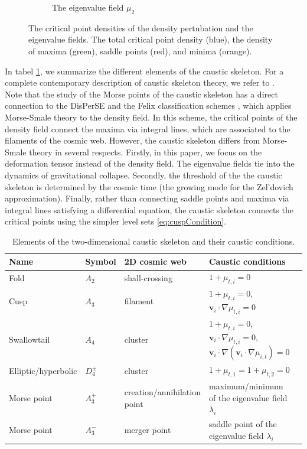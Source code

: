 \documentclass[a4paper, 11pt]{article}
\begin{document}
\begin{figure}
\begin{subfigure}[b]{0.32\textwidth}
\caption{The eigenvalue field $\mu_2$}
\end{subfigure}
\caption{The critical point densities of the density pertubation and the eigenvalue fields. The total critical point density (blue), the density of maxima (green), saddle points (red), and minima (orange).}\label{fig:critical}
\end{figure}

In tabel \ref{table:caustics}, we summarize the different elements of the caustic skeleton. For a complete contemporary description of caustic skeleton theory, we refer to \cite{Hidding:2014, Feldbrugge:2018}.\\


Note that the study of the Morse points of the caustic skeleton has a direct connection to the DisPerSE and the Felix classification schemes \cite{Pogosyan:2009, Sousbie:2011a, Sousbie:2011b, Shivashankar:2016}, which applies Morse-Smale theory to the density field. In this scheme, the critical points of the density field connect the maxima via integral lines, which are associated to the filaments of the cosmic web. However, the caustic skeleton differs from Morse-Smale theory in several respects. Firstly, in this paper, we focus on the deformation tensor instead of the density field. The eigenvalue fields tie into the dynamics of gravitational collapse. Secondly, the threshold of the the caustic skeleton is determined by the cosmic time (the growing mode for the Zel'dovich approximation). Finally, rather than connecting saddle points and maxima via integral lines satisfying a differential equation, the caustic skeleton connects the critical points using the simpler level sets \eqref{eq:cuspCondition}.


\begin{table}
\centering
{\scriptsize
\begin{tabular}{ |l | l | l | l | l|}
\hline
\textbf{Name} & \textbf{Symbol} & \textbf{2D cosmic web} & \textbf{Caustic conditions}\\
\hline
Fold & $A_2$ & shall-crossing & $1+ \mu_{t,i} = 0$ \\
\hline
Cusp & $A_3$ & filament & $1+ \mu_{t,i} = 0$, $\bm{v}_i \cdot \nabla \mu_{t,i} = 0$\\
\hline
Swallowtail &$A_4$ &  cluster & $1+ \mu_{t,i} = 0$, $\bm{v}_i \cdot \nabla \mu_{t,i} = 0,$ $\bm{v}_i \cdot \nabla(\bm{v}_i \cdot \nabla \mu_{i,t}) = 0$\\
\hline
Elliptic/hyperbolic & $D_4^{\pm}$ & cluster & $1+ \mu_{t,1} = 1+ \mu_{t,2} = 0$\\
\hline
Morse point & $A_3^+$ & creation/annihilation point& maximum/minimum of the eigenvalue field $\lambda_i$\\
\hline
Morse point & $A_3^-$ & merger point & saddle point of the eigenvalue field $\lambda_i$\\
\hline
\end{tabular}
}
\caption{Elements of the two-dimensional caustic skeleton and their caustic conditions.}
\label{table:caustics}
\end{table}
\end{document}
